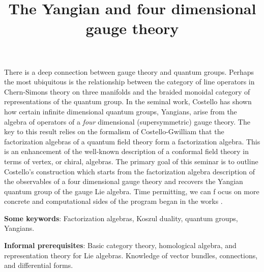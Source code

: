 \documentclass[10pt]{article}
\title{The Yangian and four dimensional gauge theory}
\begin{document}
\maketitle

There is a deep connection between gauge theory and quantum groups.
Perhaps the most ubiquitous is the relationship between the category of line operators in Chern-Simons theory on three manifolds and the braided monoidal category of representations of the quantum group.
In the seminal work, Costello \cite{CosInt, CosYangian} has shown how certain infinite dimensional quantum groups, Yangians, arise from the algebra of operators of a {\em four} dimensional (supersymmetric) gauge theory.
The key to this result relies on the formalism of Costello-Gwilliam that the factorization algebras of a quantum field theory form a factorization algebra. 
This is an enhancement of the well-known description of a conformal field theory in terms of vertex, or chiral, algebras. 
The primary goal of this seminar is to outline Costello's construction which starts from the factorization algebra description of the observables of a four dimensional gauge theory and recovers the Yangian quantum group of the gauge Lie algebra. 
Time permitting, we can f ocus on more concrete and computational sides of the program began in the works \cite{CWY1, CWY2}.

{\bf Some keywords}: Factorization algebras, Koszul duality, quantum groups, Yangians. 

{\bf Informal prerequisites}: Basic category theory, homological algebra, and representation theory for Lie algebras.
Knowledge of vector bundles, connections, and differential forms. 
\end{document}
